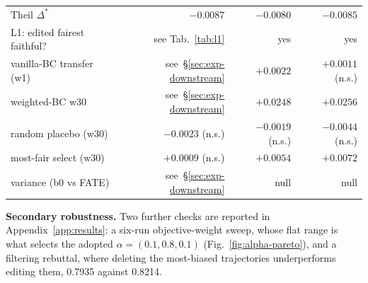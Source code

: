 \begin{table}[!ht]
\begin{tabular}{lrrr}
Theil $\Delta^{*}$ & $-0.0087$ & $-0.0080$ & $-0.0085$ \\ %
L1: edited fairest faithful? & see Tab.~\ref{tab:l1} & yes & yes \\ %
vanilla-BC transfer (w1) & see~\S\ref{sec:exp-downstream} & $+0.0022$ & $+0.0011$ (n.s.) \\ %
weighted-BC w30 & see~\S\ref{sec:exp-downstream} & $+0.0248$ & $+0.0256$ \\
\quad random placebo (w30) & $-0.0023$ (n.s.) & $-0.0019$ (n.s.) & $-0.0044$ (n.s.) \\
\quad most-fair select (w30) & $+0.0009$ (n.s.) & $+0.0054$ & $+0.0072$ \\
variance (b0 vs FATE) & see~\S\ref{sec:exp-downstream} & null & null \\ %
\bottomrule
\end{tabular}
\end{table}

\textbf{Secondary robustness.} Two further checks are reported in
Appendix~\ref{app:results}: a six-run objective-weight sweep, whose flat range
is what selects the adopted $\alpha = (0.1, 0.8, 0.1)$
(Fig.~\ref{fig:alpha-pareto}), and a filtering rebuttal, where deleting the
most-biased trajectories underperforms editing them, 0.7935 against 0.8214.

